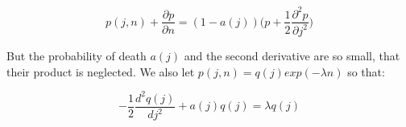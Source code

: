 \documentclass[journal]{IEEEtran}
\begin{document}
\begin{equation}
  p(j, n) + \frac{\partial p}{\partial n} = (1-a(j))\Big(p +
  \frac{1}{2}\frac{\partial^2 p}{\partial j^2}\Big)
  \nonumber
\end{equation}

But the probability of death $a(j)$ and the second derivative are so small, that
their product is neglected. We also let $p(j,n) = q(j) exp(-\lambda n)$ so that:

\begin{equation}
  -\frac{1}{2} \frac{d^2q(j)}{dj^2} + a(j)q(j) = \lambda q(j)
  \nonumber
\end{equation}

\printbibliography
\end{document}
